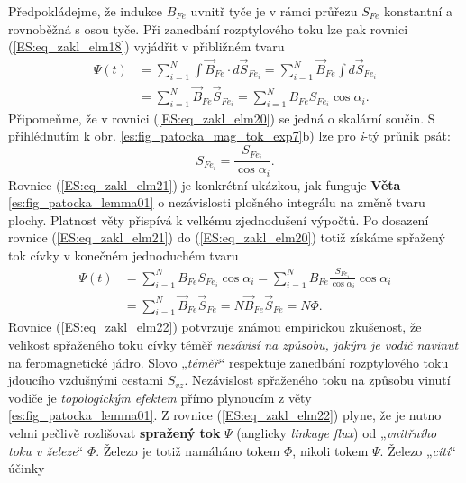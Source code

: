       Předpokládejme, že indukce \(B_{Fe}\) uvnitř tyče je v rámci průřezu \(S_{Fe}\) konstantní a 
      rovnoběžná s osou tyče. Při zanedbání rozptylového toku lze pak rovnici 
      (\ref{ES:eq_zakl_elm18}) vyjádřit v přibližném tvaru
      \begin{align}\label{ES:eq_zakl_elm20}
      \Psi(t) &= \sum_{i=1}^{N}\int\vec{B}_{Fe}\cdot d\vec{S}_{Fe_i} 
               = \sum_{i=1}^{N}\vec{B}_{Fe}\int d\vec{S}_{Fe_i}  \nonumber\\
              &= \sum_{i=1}^{N}\vec{B}_{Fe}\vec{S}_{Fe_i}
               = \sum_{i=1}^{N}B_{Fe}{S}_{Fe_i}\cos\alpha_i.
      \end{align}
      Připomeňme, že v rovnici (\ref{ES:eq_zakl_elm20}) se jedná o skalární součin. S přihlédnutím 
      k obr. \ref{es:fig_patocka_mag_tok_exp7}b) lze pro \emph{i}-tý průnik psát:
      \begin{equation}\label{ES:eq_zakl_elm21}
        S_{Fe_i} = \frac{S_{Fe_i}}{\cos\alpha_i}.
      \end{equation}
      Rovnice (\ref{ES:eq_zakl_elm21}) je konkrétní ukázkou, jak funguje \textbf{Věta} 
      \ref{es:fig_patocka_lemma01} o nezávislosti plošného integrálu na změně tvaru plochy. 
      Platnost věty přispívá k velkému zjednodušení výpočtů. Po dosazení rovnice 
      (\ref{ES:eq_zakl_elm21}) do (\ref{ES:eq_zakl_elm20}) totiž získáme spřažený tok cívky v 
      konečném jednoduchém tvaru
      \begin{align}\label{ES:eq_zakl_elm22}
        \Psi(t) &= \sum_{i=1}^{N}B_{Fe}{S}_{Fe_i}\cos\alpha_i 
                 = \sum_{i=1}^{N}B_{Fe}\frac{{S}_{Fe_i}}{\cos\alpha_i}\cos\alpha_i  \nonumber\\
                &= \sum_{i=1}^{N}\vec{B}_{Fe}\vec{S}_{Fe}
                 = N\vec{B}_{Fe}\vec{S}_{Fe} = N\Phi.
      \end{align}
      Rovnice (\ref{ES:eq_zakl_elm22}) potvrzuje známou empirickou zkušenost, že velikost 
      spřaženého toku cívky téměř \emph{nezávisí na způsobu, jakým je vodič navinut} na 
      feromagnetické jádro. Slovo „\emph{téměř}“ respektuje zanedbání rozptylového toku jdoucího 
      vzdušnými cestami \(S_{vz}\). Nezávislost spřaženého toku na způsobu vinutí vodiče je 
      \emph{topologickým efektem} přímo plynoucím z věty \ref{es:fig_patocka_lemma01}. Z rovnice 
      (\ref{ES:eq_zakl_elm22}) plyne, že je nutno velmi pečlivě rozlišovat \textbf{spražený tok} 
      \(\Psi\) (anglicky \emph{linkage flux}) od „\emph{vnitřního toku v železe}“ \(\Phi\). Železo 
      je totiž namáháno tokem \(\Phi\), nikoli tokem \(\Psi\). Železo „\emph{cítí}“ účinky 
